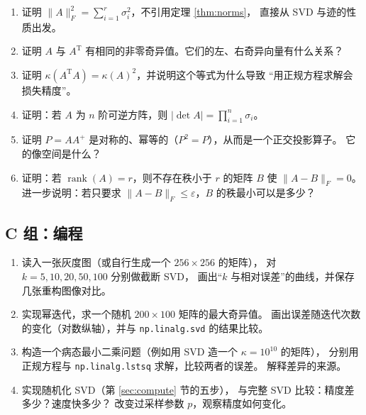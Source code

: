 \documentclass[UTF8, 11pt, a4paper, fontset=windows]{ctexart}
\theoremstyle{cnthm}
\theoremstyle{cndef}
\newcommand{\T}{^{\mathrm{T}}}
\newcommand{\nrm}[1]{\lVert #1 \rVert}
\newcommand{\abs}[1]{\lvert #1 \rvert}
\DeclareMathOperator{\rank}{rank}
\begin{document}
\begin{enumerate}[label=\textbf{B\arabic*.}, leftmargin=3.0em, itemsep=0.6em]
  \item 证明 $\nrm{A}_F^2=\sum_{i=1}^{r}\sigma_i^2$，不引用定理 \ref{thm:norms}，
        直接从 SVD 与迹的性质出发。

  \item 证明 $A$ 与 $A\T$ 有相同的非零奇异值。它们的左、右奇异向量有什么关系？

  \item 证明 $\kappa(A\T A)=\kappa(A)^2$，并说明这个等式为什么导致
        “用正规方程求解会损失精度”。

  \item 证明：若 $A$ 为 $n$ 阶可逆方阵，则 $\abs{\det A}=\prod_{i=1}^{n}\sigma_i$。

  \item 证明 $P=AA^{+}$ 是对称的、幂等的（$P^2=P$），从而是一个正交投影算子。
        它的像空间是什么？

  \item 证明：若 $\rank(A)=r$，则不存在秩小于 $r$ 的矩阵 $B$ 使 $\nrm{A-B}_F=0$。
        进一步说明：若只要求 $\nrm{A-B}_F\le\varepsilon$，$B$ 的秩最小可以是多少？
\end{enumerate}

\subsection*{C 组：编程}

\begin{enumerate}[label=\textbf{C\arabic*.}, leftmargin=3.0em, itemsep=0.6em]
  \item 读入一张灰度图（或自行生成一个 $256\times256$ 的矩阵），
        对 $k=5,10,20,50,100$ 分别做截断 SVD，
        画出“$k$ 与相对误差”的曲线，并保存几张重构图像对比。

  \item 实现幂迭代，求一个随机 $200\times100$ 矩阵的最大奇异值。
        画出误差随迭代次数的变化（对数纵轴），并与
        \texttt{np.linalg.svd} 的结果比较。

  \item 构造一个病态最小二乘问题（例如用 SVD 造一个 $\kappa=10^{10}$ 的矩阵），
        分别用正规方程与 \texttt{np.linalg.lstsq} 求解，比较两者的误差。
        解释差异的来源。

  \item 实现随机化 SVD（第 \ref{sec:compute} 节的五步），
        与完整 SVD 比较：精度差多少？速度快多少？
        改变过采样参数 $p$，观察精度如何变化。
\end{enumerate}
\end{document}
